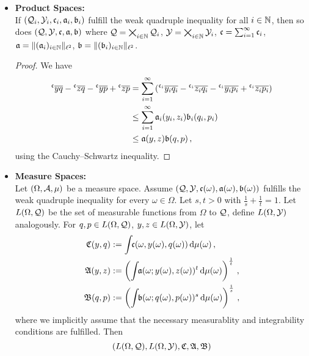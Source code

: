 \begin{itemize}
\item[] \hspace*{-0.5cm}\textbf{Product Spaces:}\\
	If $(\mathcal{Q}_i, \mathcal{Y}_i, \mathfrak{c}_i, \mathfrak{a}_i, \mathfrak{b}_i)$ fulfill the weak quadruple inequality for all $i \in \mathbb{N}$, then so does
	$(\mathcal{Q}, \mathcal{Y}, \mathfrak{c}, \mathfrak{a}, \mathfrak{b})$ where $\mathcal{Q} = \bigtimes_{i\in \mathbb{N}} \mathcal{Q}_i$, $\mathcal{Y} = \bigtimes_{i\in \mathbb{N}} \mathcal{Y}_i$, $\mathfrak{c} = \sum_{i=1}^\infty \mathfrak{c}_i$, $\mathfrak{a} = \Vert (\mathfrak{a}_i)_{i\in\mathbb{N}} \Vert_{\ell^2}$, $\mathfrak{b} = \Vert (\mathfrak{b}_i)_{i\in\mathbb{N}} \Vert_{\ell^2}$.	
	\begin{proof}
		We have
		\begin{align*}
			\olc yq- \olc zq -\olc yp+\olc zp 
			&= 
			\sum_{i=1}^\infty \br{
			\leftidx{^{\mf c_i}}{\ol {y_i}{q_i}}
			- \leftidx{^{\mf c_i}}{\ol {z_i}{q_i}} 
			- \leftidx{^{\mf c_i}}{\ol {y_i}{p_i}}
			+\leftidx{^{\mf c_i}}{\ol {z_i}{p_i}}}
			\\&\leq 
			\sum_{i=1}^\infty \mf a_i(y_i, z_i) \mf b_i(q_i, p_i)
			\\&\leq 
			 \mf a(y,z) \mf b(q,p)
			\eqcm
		\end{align*}
		using the Cauchy--Schwartz inequality.
	\end{proof}
\item[] \hspace*{-0.5cm}\textbf{Measure Spaces:}\\
	Let $(\Omega, \mathcal{A}, \mu)$ be a measure space.
	Assume $(\mathcal{Q}, \mathcal{Y}, \mathfrak{c}(\omega), \mathfrak{a}(\omega), \mathfrak{b}(\omega))$ fulfills the weak quadruple inequality for every $\omega \in \Omega$. Let $s,t>0$ with $\frac1s+\frac1t=1$. 
	Let $L(\Omega, \mathcal{Q})$ be the set of measurable functions from $\Omega$ to $\mathcal{Q}$,  define $L(\Omega, \mathcal{Y})$ analogously.
	For $q,p \in L(\Omega, \mathcal{Q})$, $y,z \in L(\Omega, \mathcal{Y})$, let
	\begin{align*}
		\mathfrak{C}(y, q) &:= \int\!\! \mathfrak{c}(\omega, y(\omega), q(\omega)) \, \mathrm{d} \mu(\omega) \, ,\\
		\mathfrak{A}(y, z) &:= \left( \int\!\! \mathfrak{a}(\omega; y(\omega),z(\omega))^t \, \mathrm{d} \mu(\omega) \right)^{\frac1t} \, , \\
		\mathfrak{B}(q, p) &:= \left( \int\!\! \mathfrak{b}(\omega; q(\omega),p(\omega))^s \, \mathrm{d} \mu(\omega) \right)^{\frac1s}
		\, ,
	\end{align*}
	where we implicitly assume that the necessary measurablity and integrability conditions are fulfilled. Then
	\begin{equation*}
		\br{L(\Omega, \mc Q), L(\Omega, \mc Y), \mf C, \mf A, \mf B}

\end{equation*}
\end{itemize}
